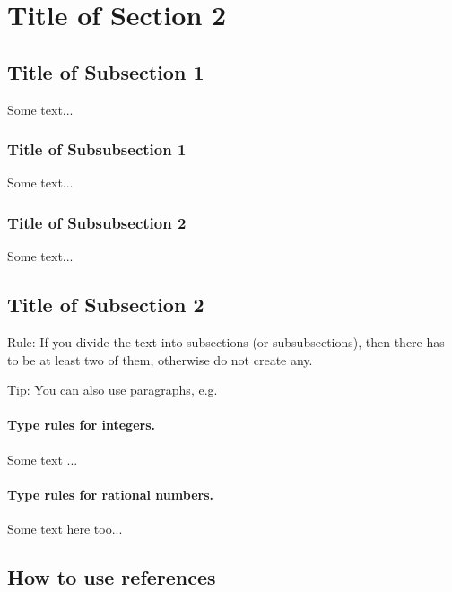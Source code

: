 \section{Title of Section 2}


\subsection{Title of Subsection 1}

Some text...

\subsubsection{Title of Subsubsection 1}

Some text...

\subsubsection{Title of Subsubsection 2}

Some text...



\subsection{Title of Subsection 2}

Rule: If you divide the text into subsections (or subsubsections), then there has to be at least two of them, otherwise do not create any.

Tip: You can also use paragraphs, e.g.
\paragraph{Type rules for integers.} Some text ...

\paragraph{Type rules for rational numbers.} Some text here too...




\subsection{How to use references} \label{sec:using_ref}

